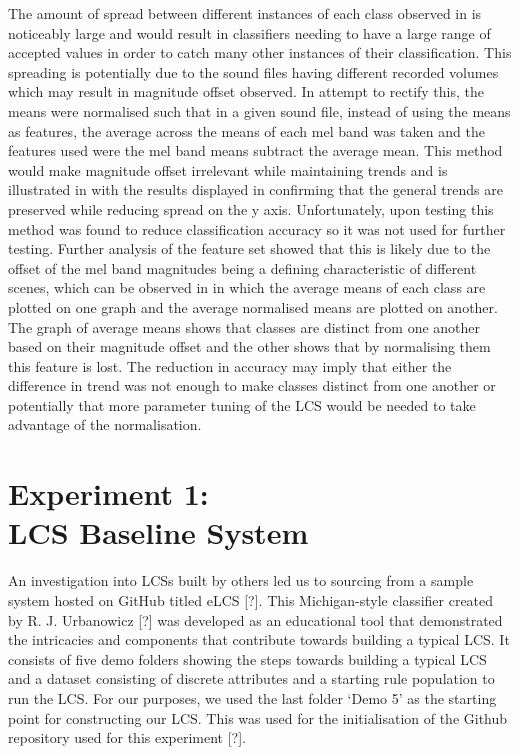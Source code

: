 \documentclass[11pt]{article}
\begin{document}
\begin{multicols}{2}
The amount of spread between different instances of each class observed in 
is noticeably large and would result in classifiers needing to have a large range of accepted values in order to catch many other instances of their classification. This spreading is potentially due to the sound files having different recorded volumes which may result in magnitude offset observed. In attempt to rectify this, the means were normalised such that in a given sound file, instead of using the means as features, the average across the means of each mel band was taken and the features used were the mel band means subtract the average mean. This method would make magnitude offset irrelevant while maintaining trends and is illustrated in 
with the results displayed in 
confirming that the general trends are preserved while reducing spread on the y axis. Unfortunately, upon testing this method was found to reduce classification accuracy so it was not used for further testing. Further analysis of the feature set showed that this is likely due to the offset of the mel band magnitudes being a defining characteristic of different scenes, which can be observed in 
in which the average means of each class are plotted on one graph and the average normalised means are plotted on another. The graph of average means shows that classes are distinct from one another based on their magnitude offset and the other shows that by normalising them this feature is lost. The reduction in accuracy may imply that either the difference in trend was not enough to make classes distinct from one another or potentially that more parameter tuning of the LCS would be needed to take advantage of the normalisation.






\section{Experiment 1:\\LCS Baseline System}
\label{sec:exp1}

An investigation into LCSs built by others led us to sourcing from a sample system hosted on GitHub titled eLCS [?]. This Michigan-style classifier created by R. J. Urbanowicz [?] was developed as an educational tool that demonstrated the intricacies and components that contribute towards building a typical LCS. It consists of five demo folders showing the steps towards building a typical LCS and a dataset consisting of discrete attributes and a starting rule population to run the LCS. For our purposes, we used the last folder ‘Demo 5’ as the starting point for constructing our LCS. This was used for the initialisation of the Github repository used for this experiment [?].


\end{multicols}
\end{document}
